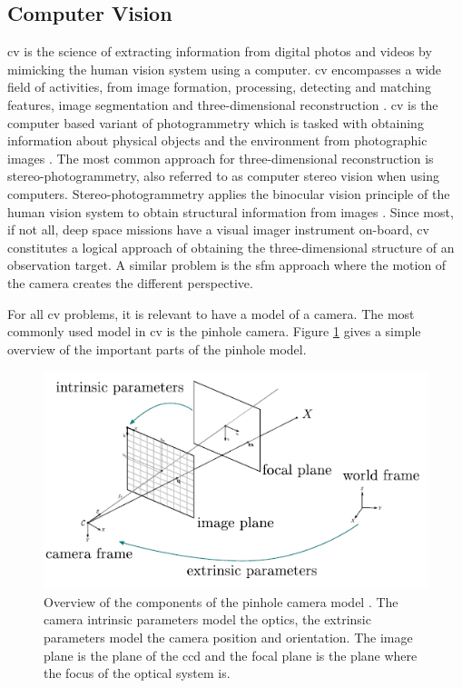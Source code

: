 \subsection{Computer Vision}
\Gls{cv} is the science of extracting information from digital photos and videos by mimicking the human vision system using a computer. \Gls{cv} encompasses a wide field of activities, from image formation, processing, detecting and matching features, image segmentation and three-dimensional reconstruction \cite{szeliski2010computer}. \Gls{cv} is the computer based variant of photogrammetry which is tasked with obtaining information about physical objects and the environment from photographic images \cite{linder2009digital}. The most common approach for three-dimensional reconstruction is stereo-photogrammetry, also referred to as computer stereo vision when using computers. Stereo-photogrammetry applies the binocular vision principle of the human vision system to obtain structural information from images \cite{do2019review}. Since most, if not all, deep space missions have a visual imager instrument on-board, \gls{cv} constitutes a logical approach of obtaining the three-dimensional structure of an observation target. A similar problem is the \gls{sfm} approach where the motion of the camera creates the different perspective.

For all \gls{cv} problems, it is relevant to have a model of a camera. The most commonly used model in \gls{cv} is the pinhole camera. Figure \ref{fig:pinhole_cam} gives a simple overview of the important parts of the pinhole model.

\begin{figure}[htb]
    \centering
    \includegraphics[width=\textwidth]{doc/thesis/0_figures/sfm/pinholeCamera.png}
    \caption{Overview of the components of the pinhole camera model \cite{openMVG}. The camera intrinsic parameters model the optics, the extrinsic parameters model the camera position and orientation. The image plane is the plane of the \gls{ccd} and the focal plane is the plane where the focus of the optical system is.}
    \label{fig:pinhole_cam}
\end{figure} 

